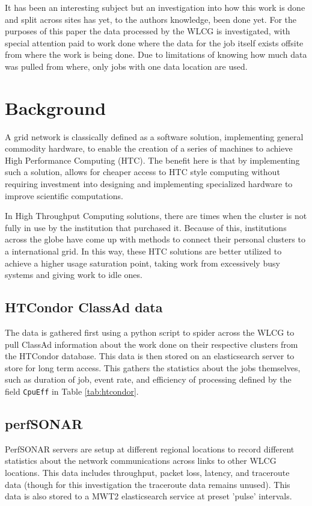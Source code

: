 \documentclass[print,ms]{nuthesis}
\begin{document}
It has been an interesting subject but an investigation into how this work is done and split across sites has yet, to the authors knowledge, been done yet. For the purposes of this paper the data processed by the WLCG is investigated, with special attention paid to work done where the data for the job itself exists offsite from where the work is being done. Due to limitations of knowing how much data was pulled from where, only jobs with one data location are used.


\chapter{Background}
A grid network is classically defined as a software solution, implementing general commodity hardware, to enable the creation of a series of machines to achieve High Performance Computing (HTC). The benefit here is that by implementing such a solution, allows for cheaper access to HTC style computing without requiring investment into designing and implementing specialized hardware to improve scientific computations.

In High Throughput Computing solutions, there are times when the cluster is not fully in use by the institution that purchased it. Because of this, institutions across the globe have come up with methods to connect their personal clusters to a international grid. In this way, these HTC solutions are better utilized to achieve a higher usage saturation point, taking work from excessively busy systems and giving work to idle ones.
\section{HTCondor ClassAd data} \label{sec:classad}
The data is gathered first using a python script to spider across the WLCG to pull ClassAd information about the work done on their respective clusters from the HTCondor\cite{condor} database. This data is then stored on an elasticsearch server to store for long term access. This gathers the statistics about the jobs themselves, such as duration of job, event rate, and efficiency of processing defined by the field \texttt{CpuEff} in Table \ref{tab:htcondor}.
\section{perfSONAR}
PerfSONAR\cite{perfsonar} servers are setup at different regional locations to record different statistics about the network communications across links to other WLCG locations. This data includes throughput, packet loss, latency, and traceroute data (though for this investigation the traceroute data remains unused). This data is also stored to a MWT2 elasticsearch service at preset 'pulse' intervals.
\end{document}
